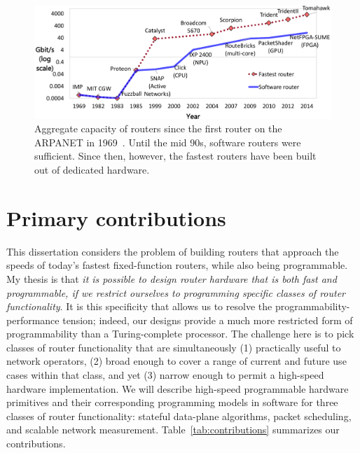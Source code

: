 \begin{figure}
\centering
\includegraphics[width=\columnwidth]{router_evolution.pdf}
\caption{Aggregate capacity of routers since the first router on the ARPANET in
1969~\cite{imp}. Until the mid 90s, software routers were sufficient. Since
then, however, the fastest routers have been built out of dedicated hardware.}
\label{fig:router_evolution}
\end{figure}

\section{Primary contributions}


This dissertation considers the problem of building routers that approach the
speeds of today's fastest fixed-function routers, while also being
programmable. My thesis is that {\em it is possible to design router hardware
that is both fast and programmable, if we restrict ourselves to programming
specific classes of router functionality}. It is this specificity that allows
us to resolve the programmability-performance tension; indeed, our designs
provide a much more restricted form of programmability than a Turing-complete
processor.  The challenge here is to pick classes of router functionality that
are simultaneously (1) practically useful to network operators, (2) broad
enough to cover a range of current and future use cases within that class, and
yet (3) narrow enough to permit a high-speed hardware implementation. We will
describe high-speed programmable hardware primitives and their corresponding
programming models in software for three classes of router functionality:
stateful data-plane algorithms, packet scheduling, and scalable network
measurement.  Table~\ref{tab:contributions} summarizes our contributions.



